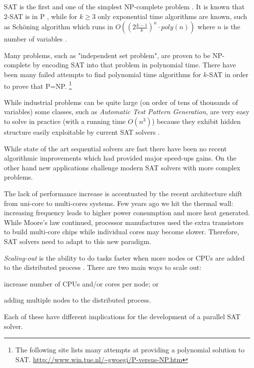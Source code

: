 SAT is the first and one of the simplest NP-complete problem
\cite{Cook:1971:CTP:800157.805047}. It is known that $2$-SAT is in
P \cite{karp}, while for $k \ge 3$ only exponential time algorithms
are known, such as Sch\"{o}ning algorithm which runs in $O((2\frac{k
- 1}{k})^n \cdot poly(n))$ where $n$ is the number of variables
\cite{Schoning:1999:PAK:795665.796524}.

Many problems, such as "independent set problem", are proven to be
NP-complete by encoding SAT into that problem in polynomial time.
There have been many failed attempts to find polynomial time
algorithms for $k$-SAT in order to prove that P=NP.  \footnote{The
following site lists many attempts at providing a polynomial solution
to SAT. \url{http://www.win.tue.nl/~gwoegi/P-versus-NP.htm}}

While industrial problems can be quite large (on order
of tens of thousands of variables) some classes, such as
\emph{Automatic Test Pattern Generation}, are very easy to solve
in practice (with a running time $O(n^3)$) because they exhibit
hidden structure easily exploitable by current SAT solvers
\cite{Prasad:1999:WAE:309847.309857}.

While state of the art sequential solvers are fast there have
been no recent algorithmic improvements which had provided major
speed-ups gains. On the other hand new applications challenge modern
SAT solvers with more complex problems.

The lack of performance increase is accentuated by the recent
architecture shift from uni-core to multi-cores systems. Few
years ago we hit the thermal wall: increasing frequency leads to
higher power consumption and more heat generated. While Moore's law
continued, processor manufactures used the extra transistors to build
multi-core chips while individual cores may become slower.
Therefore, SAT solvers need to adapt to this new paradigm.

\emph{Scaling-out} is the ability to do tasks faster when
more nodes or CPUs are added to the distributed process
\cite{citeulike:1567858}. There are two main ways to scale
out:
\begin{inparaenum}[a)]
  \item increase number of CPUs and/or cores per node; or
  \item adding multiple nodes to the distributed process.
\end{inparaenum} Each of these have different implications
for the development of a parallel SAT solver.

